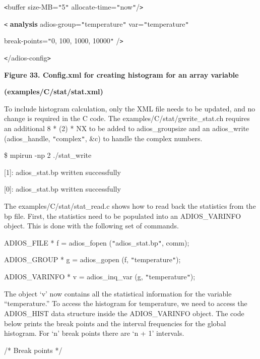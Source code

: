\texttt{<}buffer size-MB=\texttt{"}5\texttt{"} allocate-time=\texttt{"}now\texttt{"}/\texttt{>}

{\color{color02} \texttt{<}}{\color{color02} \textbf{analysis}}{\color{color02}  
adios-group=\texttt{"}temperature\texttt{"} var=\texttt{"}temperature\texttt{"}}

{\color{color02} break-points=\texttt{"}0, 100, 1000, 10000\texttt{"} /\texttt{>}}

\texttt{<}/adios-config\texttt{>}

\label{HToc144350192}

\begin{center}
{\color{color20} \textbf{Figure 33. Config.xml for creating histogram for an array 
variable}}

{\color{color20} \textbf{(examples/C/stat/stat.xml)}}
\end{center}

To include histogram calculation, only the XML file needs to be updated, and no 
change is required in the C code. The examples/C/stat/gwrite\_stat.ch requires 
an additional {\color{color02} 8 * (2) * NX} to be added to adios\_groupsize and 
an adios\_write (adios\_handle, \texttt{"}complex\texttt{"}, \&c) to handle the 
complex numbers.

\$ mpirun -np 2 ./stat\_write

[1]: adios\_stat.bp written successfully

[0]: adios\_stat.bp written successfully

The examples/C/stat/stat\_read.c shows how to read back the statistics from the 
bp file. First, the statistics need to be populated into an ADIOS\_VARINFO object. 
This is done with the following set of commands.

ADIOS\_FILE * f = adios\_fopen (\texttt{"}adios\_stat.bp\texttt{"}, comm);

ADIOS\_GROUP * g = adios\_gopen (f, \texttt{"}temperature\texttt{"});

ADIOS\_VARINFO * v = adios\_inq\_var (g, \texttt{"}temperature\texttt{"});

The object `v' now contains all the statistical information for the variable ``temperature.'' 
To access the histogram for temperature, we need to access the ADIOS\_HIST data 
structure inside the ADIOS\_VARINFO object. The code below prints the break points 
and the interval frequencies for the global histogram. For `n' break points there 
are `n + 1' intervals.

/* Break points */

